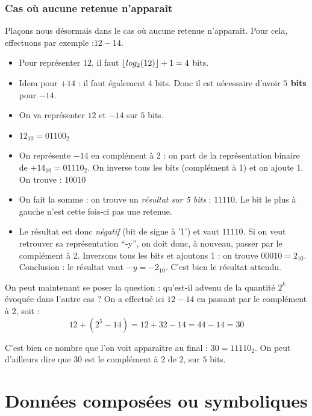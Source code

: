 \subsubsection{Cas où aucune retenue n'apparaît}
Plaçons nous désormais dans le cas où aucune retenue n'apparaît. Pour cela, effectuons par exemple :$12-14$.
\begin{itemize}
\item Pour représenter $12$, il faut $\floor*{log_2(12)}+1=4$ bits.
\item Idem pour $+14$ : il faut également $4$ bits. Donc il est nécessaire d'avoir { \bf $5$ bits} pour $-14$.
\item On va représenter $12$ et $-14$ sur $5$ bits.
\item $12_{10}=01100_2$
\item On représente $-14$ en complément à 2 : on part de la représentation binaire de $+14_{10}=01110_2$. On inverse tous les bits (complément à 1) et on ajoute 1. On trouve : $10010$
\item On fait la somme : on trouve un {\it résultat sur 5 bits} : $11110$. Le bit le plus à gauche n'est cette fois-ci pas une retenue.
\item Le résultat est donc {\it négatif} (bit de signe à '1') et vaut $11110$. Si on veut retrouver sa représentation ``-y'', on doit donc, à nouveau, passer par le complément à 2. Inversons tous les bits et ajoutons 1 : on trouve $00010=2_{10}$. Conclusion : le résultat vaut $-y=-2_{10}$. C'est bien le résultat attendu.
\end{itemize}

On peut maintenant se poser la question : qu'est-il advenu de la quantité $2^k$ évoquée dans l'autre cas ?
On a effectué ici $12-14$ en passant par le complément à 2, soit : $$12+(2^5-14)=12+32-14=44-14=30$$

C'est bien ce nombre que l'on voit apparaître au final : $30=11110_2$. On peut d'ailleurs dire que $30$ est le complément à 2 de $2$, sur $5$ bits.

\section{Données composées ou symboliques}
